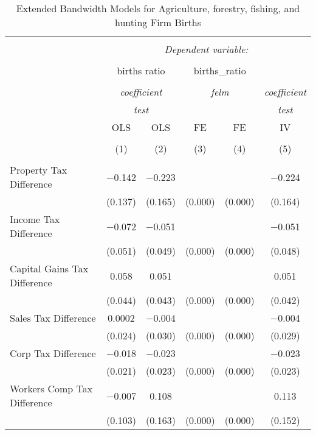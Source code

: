 
\begin{table}[!htbp] \centering 
  \caption{Extended Bandwidth Models for  Agriculture, forestry, fishing, and hunting Firm Births} 
  \label{} 
\begin{tabular}{@{\extracolsep{5pt}}lccccc} 
\\[-1.8ex]\hline 
\hline \\[-1.8ex] 
 & \multicolumn{5}{c}{\textit{Dependent variable:}} \\ 
\cline{2-6} 
\\[-1.8ex] & \multicolumn{2}{c}{births ratio} & \multicolumn{2}{c}{births\_ratio} &   \\ 
\\[-1.8ex] & \multicolumn{2}{c}{\textit{coefficient}} & \multicolumn{2}{c}{\textit{felm}} & \textit{coefficient} \\ 
 & \multicolumn{2}{c}{\textit{test}} & \multicolumn{2}{c}{\textit{}} & \textit{test} \\ 
 & OLS & OLS & FE & FE & IV \\ 
\\[-1.8ex] & (1) & (2) & (3) & (4) & (5)\\ 
\hline \\[-1.8ex] 
 Property Tax Difference & $-$0.142 & $-$0.223 &  &  & $-$0.224 \\ 
  & (0.137) & (0.165) & (0.000) & (0.000) & (0.164) \\ 
  Income Tax Difference & $-$0.072 & $-$0.051 &  &  & $-$0.051 \\ 
  & (0.051) & (0.049) & (0.000) & (0.000) & (0.048) \\ 
  Capital Gains Tax Difference & 0.058 & 0.051 &  &  & 0.051 \\ 
  & (0.044) & (0.043) & (0.000) & (0.000) & (0.042) \\ 
  Sales Tax Difference & 0.0002 & $-$0.004 &  &  & $-$0.004 \\ 
  & (0.024) & (0.030) & (0.000) & (0.000) & (0.029) \\ 
  Corp Tax Difference & $-$0.018 & $-$0.023 &  &  & $-$0.023 \\ 
  & (0.021) & (0.023) & (0.000) & (0.000) & (0.023) \\ 
  Workers Comp Tax Difference & $-$0.007 & 0.108 &  &  & 0.113 \\ 
  & (0.103) & (0.163) & (0.000) & (0.000) & (0.152) \\ 

\end{tabular}
\end{table}
